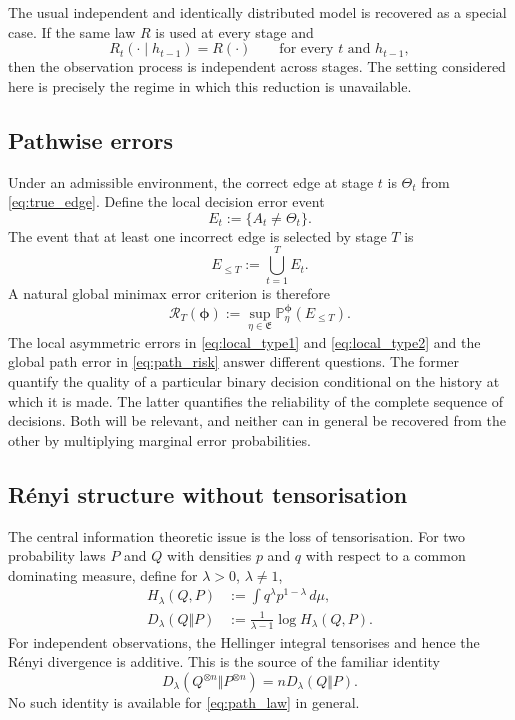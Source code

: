 \documentclass[11pt]{article}
\newcommand{\Prob}{\mathbb{P}}
\begin{document}
The usual independent and identically distributed model is recovered as a special case. If the same law $R$ is used at every stage and
\[
R_t(\cdot\mid h_{t-1})=R(\cdot)
\qquad
\text{for every }t\text{ and }h_{t-1},
\]
then the observation process is independent across stages. The setting considered here is precisely the regime in which this reduction is unavailable.

\subsection{Pathwise errors}

Under an admissible environment, the correct edge at stage $t$ is $\Theta_t$ from \eqref{eq:true_edge}. Define the local decision error event
\begin{equation}
E_t:=\{A_t\neq\Theta_t\}.
\label{eq:local_error_event}
\end{equation}
The event that at least one incorrect edge is selected by stage $T$ is
\begin{equation}
E_{\le T}:=\bigcup_{t=1}^{T}E_t.
\label{eq:path_error_event}
\end{equation}
A natural global minimax error criterion is therefore
\begin{equation}
\mathcal{R}_T(\boldsymbol{\phi})
:=
\sup_{\eta\in\mathfrak{E}}
\Prob_{\eta}^{\boldsymbol{\phi}}(E_{\le T}).
\label{eq:path_risk}
\end{equation}
The local asymmetric errors in \eqref{eq:local_type1} and \eqref{eq:local_type2} and the global path error in \eqref{eq:path_risk} answer different questions. The former quantify the quality of a particular binary decision conditional on the history at which it is made. The latter quantifies the reliability of the complete sequence of decisions. Both will be relevant, and neither can in general be recovered from the other by multiplying marginal error probabilities.

\subsection{R\'enyi structure without tensorisation}

The central information theoretic issue is the loss of tensorisation. For two probability laws $P$ and $Q$ with densities $p$ and $q$ with respect to a common dominating measure, define for $\lambda>0$, $\lambda\neq1$,
\begin{align}
H_{\lambda}(Q,P)
&:=
\int q^{\lambda}p^{1-\lambda}\,d\mu,
\label{eq:hellinger_integral}\\
D_{\lambda}(Q\Vert P)
&:=
\frac{1}{\lambda-1}\log H_{\lambda}(Q,P).
\label{eq:renyi_divergence}
\end{align}
For independent observations, the Hellinger integral tensorises and hence the R\'enyi divergence is additive. This is the source of the familiar identity
\[
D_{\lambda}(Q^{\otimes n}\Vert P^{\otimes n})
=
nD_{\lambda}(Q\Vert P).
\]
No such identity is available for \eqref{eq:path_law} in general.
\end{document}
